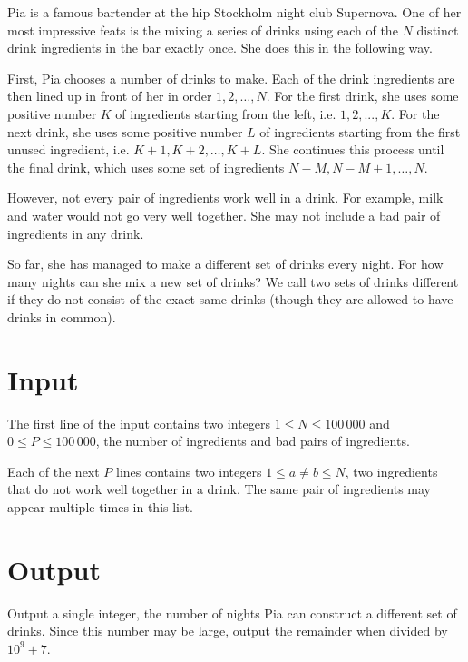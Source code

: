Pia is a famous bartender at the hip Stockholm night club Supernova.
One of her most impressive feats is the mixing a series of drinks using each of the $N$ distinct drink ingredients in the bar exactly once.
She does this in the following way.

First, Pia chooses a number of drinks to make.
Each of the drink ingredients are then lined up in front of her in order $1, 2, \dots, N$.
For the first drink, she uses some positive number $K$ of ingredients starting from the left, i.e. $1, 2, ..., K$.
For the next drink, she uses some positive number $L$ of ingredients starting from the first unused ingredient, i.e. $K + 1, K + 2, \dots, K + L$.
She continues this process until the final drink, which uses some set of ingredients $N - M, N - M + 1, \dots, N$.

However, not every pair of ingredients work well in a drink.
For example, milk and water would not go very well together.
She may not include a bad pair of ingredients in any drink.

So far, she has managed to make a different set of drinks every night.
For how many nights can she mix a new set of drinks?
We call two sets of drinks different if they do not consist of the exact same drinks (though they are allowed to have drinks in common).

\section*{Input}
The first line of the input contains two integers $1 \le N \le 100\,000$ and $0 \le P \le 100\,000$, the number of ingredients and bad pairs of ingredients.

Each of the next $P$ lines contains two integers $1 \le a \not= b \le N$, two ingredients that do not work well together in a drink.
The same pair of ingredients may appear multiple times in this list.

\section*{Output}
Output a single integer, the number of nights Pia can construct a different set of drinks.
Since this number may be large, output the remainder when divided by $10^9 + 7$.
